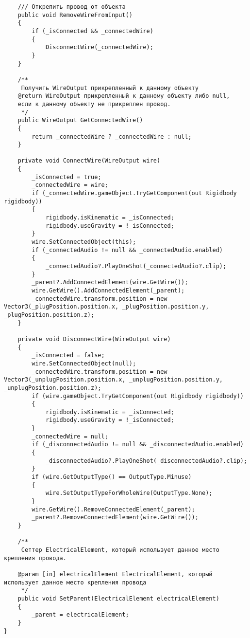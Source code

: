 \begin{verbatim}
    /// Открепить провод от объекта
    public void RemoveWireFromInput()
    {
        if (_isConnected && _connectedWire)
        {
            DisconnectWire(_connectedWire);
        }
    }

    /** 
     Получить WireOutput прикрепленный к данному объекту
    @return WireOutput прикрепленный к данному объекту либо null, 
    если к данному объекту не прикреплен провод.
     */
    public WireOutput GetConnectedWire()
    {
        return _connectedWire ? _connectedWire : null;
    }

    private void ConnectWire(WireOutput wire)
    {
        _isConnected = true;
        _connectedWire = wire;
        if (_connectedWire.gameObject.TryGetComponent(out Rigidbody rigidbody))
        {
            rigidbody.isKinematic = _isConnected;
            rigidbody.useGravity = !_isConnected;
        }
        wire.SetConnectedObject(this);
        if (_connectedAudio != null && _connectedAudio.enabled)
        {
            _connectedAudio?.PlayOneShot(_connectedAudio?.clip);
        }
        _parent?.AddConnectedElement(wire.GetWire());
        wire.GetWire().AddConnectedElement(_parent);
        _connectedWire.transform.position = new Vector3(_plugPosition.position.x, _plugPosition.position.y, _plugPosition.position.z);
    }

    private void DisconnectWire(WireOutput wire)
    {
        _isConnected = false;
        wire.SetConnectedObject(null);
        _connectedWire.transform.position = new Vector3(_unplugPosition.position.x, _unplugPosition.position.y, _unplugPosition.position.z);
        if (wire.gameObject.TryGetComponent(out Rigidbody rigidbody))
        {
            rigidbody.isKinematic = _isConnected;
            rigidbody.useGravity = !_isConnected;
        }
        _connectedWire = null;
        if (_disconnectedAudio != null && _disconnectedAudio.enabled)
        {
            _disconnectedAudio?.PlayOneShot(_disconnectedAudio?.clip);
        }
        if (wire.GetOutputType() == OutputType.Minuse)
        {
            wire.SetOutputTypeForWholeWire(OutputType.None);
        }
        wire.GetWire().RemoveConnectedElement(_parent);
        _parent?.RemoveConnectedElement(wire.GetWire());
    }

    /**
     Сеттер ElectricalElement, который использует данное место крепления провода.

    @param [in] electricalElement ElectricalElement, который использует данное место крепления провода
     */
    public void SetParent(ElectricalElement electricalElement)
    {
        _parent = electricalElement;
    }
}

\end{verbatim}

